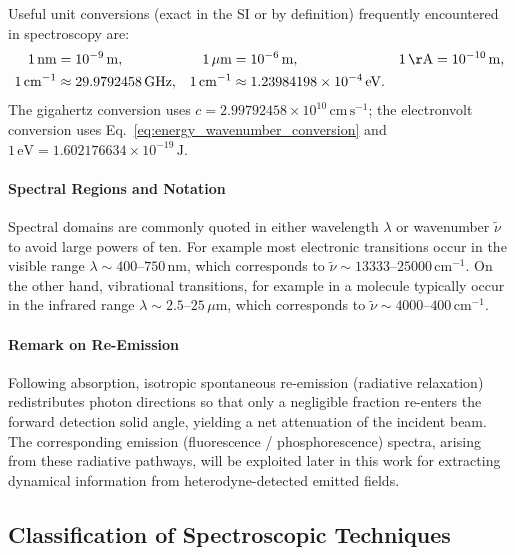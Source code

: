 \noindent Useful unit conversions (exact in the SI or by definition) frequently encountered in spectroscopy are:
\begin{align}
	1\,\mathrm{nm}      & = 10^{-9}\,\mathrm{m},                        &
	1\,\mu\mathrm{m}    & = 10^{-6}\,\mathrm{m},                        &
	1\,\mathrm{\AA}     & = 10^{-10}\,\mathrm{m},                         \\
	1\,\mathrm{cm}^{-1} & \approx 29.9792458\,\mathrm{GHz},             &
	1\,\mathrm{cm}^{-1} & \approx 1.23984198\times10^{-4}\,\mathrm{eV}.
	\label{eq:unit_conversions}
\end{align}
The gigahertz conversion uses $c = 2.99792458\times10^{10}\,\mathrm{cm\,s^{-1}}$; the electronvolt conversion uses Eq.~\eqref{eq:energy_wavenumber_conversion} and $1\,\mathrm{eV} = 1.602176634\times10^{-19}\,\mathrm{J}$.

\paragraph{Spectral Regions and Notation}
\noindent Spectral domains are commonly quoted in either wavelength $\lambda$ or wavenumber $\tilde{\nu}$ to avoid large powers of ten.
For example most electronic transitions occur in the visible range $\lambda \sim 400$--$750\,\mathrm{nm}$, which corresponds to $\tilde{\nu} \sim 13333$--$25000\,\mathrm{cm}^{-1}$. On the other hand, vibrational transitions, for example in a molecule typically occur in the infrared range $\lambda \sim 2.5$--$25\,\mu\mathrm{m}$, which corresponds to $\tilde{\nu} \sim 4000$--$400\,\mathrm{cm}^{-1}$.

\paragraph{Remark on Re-Emission}
\noindent Following absorption, isotropic spontaneous re-emission (radiative relaxation) redistributes photon directions so that only a negligible fraction re-enters the forward detection solid angle, yielding a net attenuation of the incident beam. The corresponding emission (fluorescence / phosphorescence) spectra, arising from these radiative pathways, will be exploited later in this work for extracting dynamical information from heterodyne-detected emitted fields.

\subsection{Classification of Spectroscopic Techniques}
\label{subsec:spectroscopy_classification}

